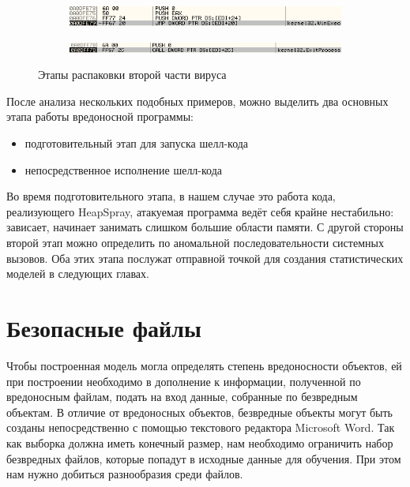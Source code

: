 \begin{figure}[ht]
\begin{subfigure}[h]{0.6\textwidth}
    \end{subfigure}        
    \begin{subfigure}[h]{0.6\textwidth}
    \centering
        \includegraphics[scale=0.7]{1.pdf/pasted-image-41.png}
        \caption{}
        
    \end{subfigure}         
    \begin{subfigure}[h]{0.6\textwidth}
    \centering
        \includegraphics[scale=0.7]{1.pdf/pasted-image-43.png}
        \caption{}
    \end{subfigure}
    \caption{Этапы распаковки второй части вируса}
    \label{fig_parsetree}
\end{figure}


После анализа нескольких подобных примеров, можно выделить два основных этапа работы вредоносной программы:
\begin{itemize}
\item подготовительный этап для запуска шелл-кода
\item непосредственное исполнение шелл-кода
\end{itemize}

Во время подготовительного этапа, в нашем случае это работа кода, реализующего HeapSpray, атакуемая программа ведёт себя крайне нестабильно: зависает, начинает занимать слишком большие области памяти.
С другой стороны второй этап можно определить по аномальной последовательности системных вызовов.
Оба этих этапа послужат отправной точкой для создания статистических моделей в следующих главах.

\section{Безопасные файлы}

Чтобы построенная модель могла определять степень вредоносности объектов, ей при построении необходимо в дополнение к информации, полученной по вредоносным файлам, подать на вход данные, собранные по безвредным объектам.
В отличие от вредоносных объектов, безвредные объекты могут быть созданы непосредственно с помощью текстового редактора Microsoft Word.
Так как выборка должна иметь конечный размер, нам необходимо ограничить набор безвредных файлов, которые попадут в исходные данные для обучения.
При этом нам нужно добиться разнообразия среди файлов.

